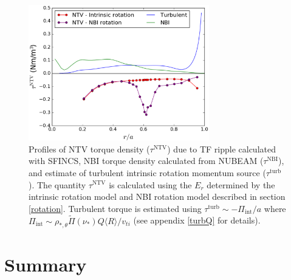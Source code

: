 \documentclass[aip, pop, preprint]{revtex4-1}
\numberwithin{figure}{section}
\numberwithin{equation}{section}
\begin{document}
\begin{figure}[h!]
\centering
\includegraphics[width=0.7\textwidth]{figure10.eps}
\caption{\label{fig:alltorque} Profiles of NTV torque density ($\tau^{\mathrm{NTV}}$) due to TF ripple calculated with SFINCS, NBI torque density calculated from NUBEAM ($\tau^{\mathrm{NBI}}$), and estimate of turbulent intrinsic rotation momentum source ($\tau^{\mathrm{turb}}$). The quantity $\tau^{\mathrm{NTV}}$ is calculated using the $E_r$ determined by the intrinsic rotation model and NBI rotation model described in section \ref{rotation}. Turbulent torque is estimated using $\tau^{\mathrm{turb}} \sim -\Pi_{\mathrm{int}}/a$ where $\Pi_{\mathrm{int}} \sim \rho_{*, \theta} \widetilde{\Pi}(\nu_*) Q \langle R \rangle/v_{ti}$ (see appendix \ref{turbQ} for details).}
\end{figure}

\section{Summary}\label{summary}
\end{document}
